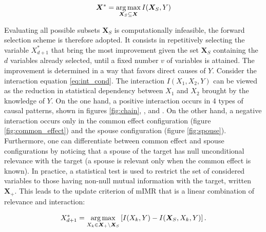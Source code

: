 \begin{equation}
\bm X^*=\operatorname*{arg\,max}_{\bm X_S\subseteq \bm X} I(\bm X_S,Y)
\end{equation}

Evaluating all possible subsets $\bm X_S$ is computationally infeasible, the
forward selection scheme is therefore adopted. It consists in repetitively
selecting the variable $X_{d+1}^*$ that bring the most improvement given the set
$\bm X_S$ containing the $d$ variables already selected, until a fixed number
$v$ of variables is attained. The improvement is determined in a way that favors
direct causes of $Y$. Consider the interaction equation \ref{eq:int_cond}. The
interaction $I(X_1, X_2, Y)$ can be viewed as the reduction in statistical
dependency between $X_1$ and $X_2$ brought by the knowledge of $Y$. On the one
hand, a positive interaction occurs in 4 types of causal patterns, shown in
figures \ref{fig:chain}, ,  and
. On the other hand, a negative interaction occurs only
in the common effect configuration (figure \ref{fig:common_effect}) and the
spouse configuration (figure \ref{fig:spouse}). Furthermore, one can
differentiate between common effect and spouse configurations by noticing that a
spouse of the target has null unconditional relevance with the target (a spouse
is relevant only when the common effect is known). In practice, a statistical
test is used to restrict the set of considered variables to those having
non-null mutual information with the target, written $\bm X_+$. This leads to
the update criterion of mIMR that is a linear combination of relevance and
interaction:

\begin{equation}
    X_{d+1}^* = \operatorname*{arg\,max}_{X_k\in\bm X_+ \setminus \bm X_S}
    \left[ I(X_k,Y) - I(\bm X_S, X_k, Y)\right].
\end{equation}

